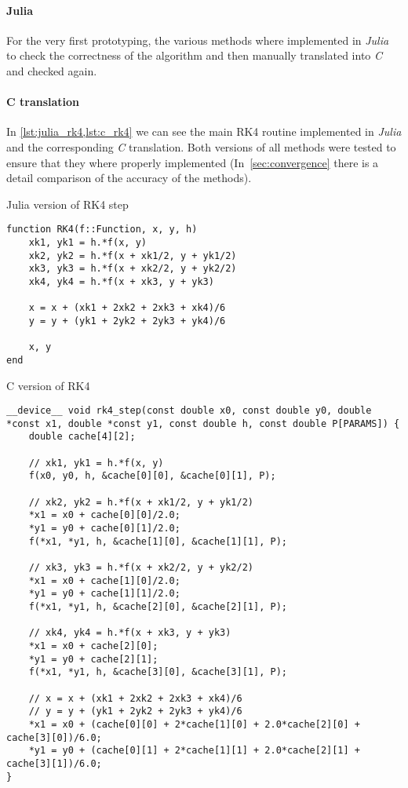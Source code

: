 \paragraph{Julia}
For the very first prototyping, the various methods where implemented in \emph{Julia}
to check the correctness of the algorithm and then manually translated into \emph{C}
and checked again.

\paragraph{C translation}

In \cref{lst:julia_rk4,lst:c_rk4} we can see the main RK4 routine implemented in \emph{Julia} and the corresponding \emph{C} translation. Both versions of all methods were tested to ensure that they where properly implemented (In~\cref{sec:convergence} there is a detail comparison of the accuracy of the methods).



\begin{listing}[H]
    \caption{Julia version of RK4 step}
    \label{lst:julia_rk4}
\begin{verbatim}
function RK4(f::Function, x, y, h)
    xk1, yk1 = h.*f(x, y)
    xk2, yk2 = h.*f(x + xk1/2, y + yk1/2)
    xk3, yk3 = h.*f(x + xk2/2, y + yk2/2)
    xk4, yk4 = h.*f(x + xk3, y + yk3)

    x = x + (xk1 + 2xk2 + 2xk3 + xk4)/6
    y = y + (yk1 + 2yk2 + 2yk3 + yk4)/6

    x, y
end
\end{verbatim}
\end{listing}

\begin{listing}[H]
    \caption{C version of RK4}
    \label{lst:c_rk4}
\begin{verbatim}
__device__ void rk4_step(const double x0, const double y0, double *const x1, double *const y1, const double h, const double P[PARAMS]) {
    double cache[4][2];

    // xk1, yk1 = h.*f(x, y)
    f(x0, y0, h, &cache[0][0], &cache[0][1], P);

    // xk2, yk2 = h.*f(x + xk1/2, y + yk1/2)
    *x1 = x0 + cache[0][0]/2.0;
    *y1 = y0 + cache[0][1]/2.0;
    f(*x1, *y1, h, &cache[1][0], &cache[1][1], P);

    // xk3, yk3 = h.*f(x + xk2/2, y + yk2/2)
    *x1 = x0 + cache[1][0]/2.0;
    *y1 = y0 + cache[1][1]/2.0;
    f(*x1, *y1, h, &cache[2][0], &cache[2][1], P);

    // xk4, yk4 = h.*f(x + xk3, y + yk3)
    *x1 = x0 + cache[2][0];
    *y1 = y0 + cache[2][1];
    f(*x1, *y1, h, &cache[3][0], &cache[3][1], P);

    // x = x + (xk1 + 2xk2 + 2xk3 + xk4)/6
    // y = y + (yk1 + 2yk2 + 2yk3 + yk4)/6
    *x1 = x0 + (cache[0][0] + 2*cache[1][0] + 2.0*cache[2][0] + cache[3][0])/6.0;
    *y1 = y0 + (cache[0][1] + 2*cache[1][1] + 2.0*cache[2][1] + cache[3][1])/6.0;
}
\end{verbatim}
\end{listing}

